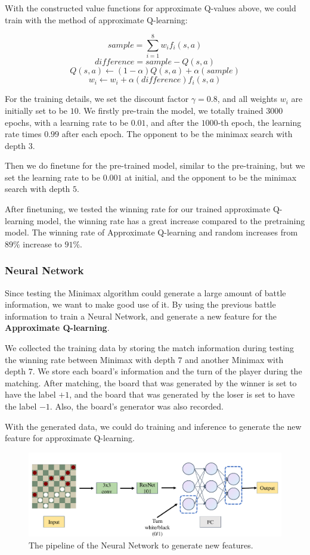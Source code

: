 With the constructed value functions for approximate Q-values above, we could train with the method of approximate Q-learning:

$$sample = \sum_{i=1}^8w_if_i(s,a)$$
$$difference = sample - Q(s,a)$$
$$Q(s,a) \gets (1 - \alpha)Q(s,a) + \alpha (sample)$$
$$w_i \gets w_i + \alpha (difference)f_i(s,a)$$

For the training details, we set the discount factor $\gamma=0.8$, and all weights $w_i$ are initially set to be $10$. We firstly pre-train the model, we totally trained $3000$ epochs, with a learning rate to be $0.01$, and after the $1000$-th epoch, the learning rate times $0.99$ after each epoch. The opponent to be the minimax search with depth $3$.

Then we do finetune for the pre-trained model, similar to the pre-training, but we set the learning rate to be $0.001$ at initial, and the opponent to be the minimax search with depth $5$.

After finetuning, we tested the winning rate for our trained approximate Q-learning model, the winning rate has a great increase compared to the pretraining model. The winning rate of Approximate Q-learning and random increases from $89\%$ increase to $91\%$.

\subsubsection{Neural Network}

Since testing the Minimax algorithm could generate a large amount of battle information, we want to make good use of it. By using the previous battle information to train a Neural Network, and generate a new feature for the \textbf{Approximate Q-learning}.

We collected the training data by storing the match information during testing the winning rate between Minimax with depth $7$ and another Minimax with depth $7$.
We store each board's information and the turn of the player during the matching. After matching, the board that was generated by the winner is set to have the label $+1$, and the board that was generated by the loser is set to have the label $-1$. Also, the board's generator was also recorded.

With the generated data, we could do training and inference to generate the new feature for approximate Q-learning.

\begin{figure}[t]
    \centering
    \includegraphics[width=\linewidth]{figures/neural.pdf}
    \caption{The pipeline of the Neural Network to generate new features.}
    \label{fig:pipeline}
\end{figure}

